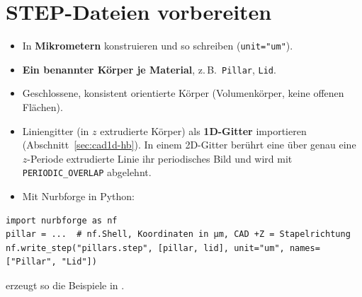 \section{STEP-Dateien vorbereiten}
\begin{itemize}
  \item In \textbf{Mikrometern} konstruieren und so schreiben (\texttt{unit="um"}).
  \item \textbf{Ein benannter Körper je Material}, z.\,B.\ \texttt{Pillar}, \texttt{Lid}.
  \item Geschlossene, konsistent orientierte Körper (Volumenkörper, keine offenen Flächen).
  \item Liniengitter (in $z$ extrudierte Körper) als \textbf{1D-Gitter} importieren (Abschnitt~\ref{sec:cad1d-hb}).
        In einem 2D-Gitter berührt eine über genau eine $z$-Periode extrudierte Linie ihr periodisches Bild und wird
        mit \texttt{PERIODIC\_OVERLAP} abgelehnt.
  \item Mit Nurbforge in Python:
\end{itemize}
\begin{lstlisting}[style=py]
import nurbforge as nf
pillar = ...  # nf.Shell, Koordinaten in µm, CAD +Z = Stapelrichtung
nf.write_step("pillars.step", [pillar, lid], unit="um", names=["Pillar", "Lid"])
\end{lstlisting}
 erzeugt so die Beispiele in .

